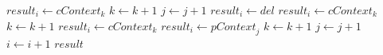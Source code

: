 \documentclass[11pt]{article}
\begin{document}
\begin{algorithm}
\begin{algorithmic}[1]
                  \State $\textit{result}_i \gets \textit{cContext}_k$
                  \State $\textit{k} \gets \textit{k} + 1$
                \EndCase
              \EndSwitch
              \State $\textit{j} \gets \textit{j} + 1$
            \EndCase
                 
                  \State $\textit{result}_i \gets \textit{del}$
                \EndCase
                 
                  \State $\textit{result}_i \gets \textit{cContext}_k$
                  \State $\textit{k} \gets \textit{k} + 1$
                \EndCase
                 
                    \State $\textit{result}_i \gets \textit{cContext}_k$
                  \Else
                    \State $\textit{result}_i \gets \textit{pContext}_j$
                  \EndIf
                    \State $\textit{k} \gets \textit{k} + 1$
                \EndCase
              \EndSwitch
              \State $\textit{j} \gets \textit{j} + 1$
            \EndCase
          \EndSwitch
        \EndIf
        \State $\textit{i} \gets \textit{i} + 1$
      \EndFor
      \Return $\textit{result}$
    \EndFunction
  \end{algorithmic}
\end{algorithm}
\end{document}
